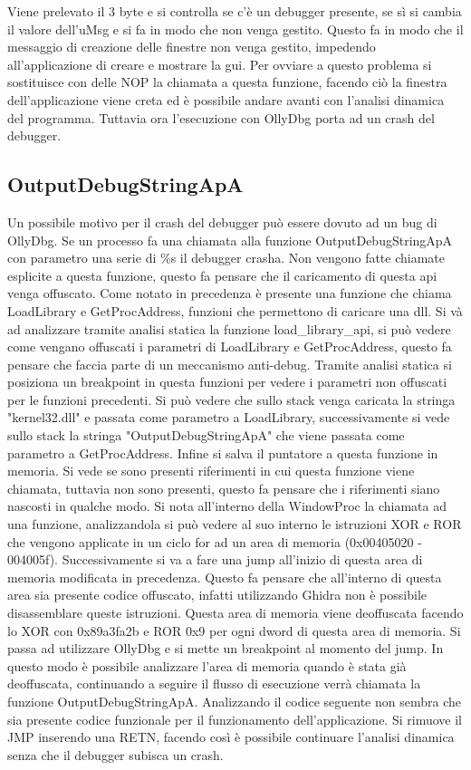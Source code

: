 \documentclass[a4paper,10pt]{article}
\begin{document}
 Viene prelevato il 3 byte e si controlla se c'è un debugger presente, se sì si cambia il valore dell'uMsg e si fa in modo che non venga gestito. Questo fa in modo che il messaggio di creazione delle finestre non venga gestito, impedendo all'applicazione di creare e mostrare la gui. Per ovviare a questo problema si sostituisce con delle NOP la chiamata a questa funzione, facendo ciò la finestra dell'applicazione viene creta ed è possibile andare avanti con l'analisi dinamica del programma. Tuttavia ora l'esecuzione con OllyDbg porta ad un crash del debugger.

\subsection{OutputDebugStringApA}
Un possibile motivo per il crash del debugger può essere dovuto ad un bug di OllyDbg. Se un processo fa una chiamata alla funzione OutputDebugStringApA con parametro una serie di \%s il debugger crasha. Non vengono fatte chiamate esplicite a questa funzione, questo fa pensare che il caricamento di questa api venga offuscato. Come notato in precedenza è presente una funzione che chiama LoadLibrary e GetProcAddress, funzioni che permettono di caricare una dll. Si và ad analizzare tramite analisi statica la funzione load\_library\_api, si può vedere come vengano offuscati i parametri di LoadLibrary e GetProcAddress, questo fa pensare che faccia parte di un meccanismo anti-debug. Tramite analisi statica si posiziona un breakpoint in questa funzioni per vedere i parametri non offuscati per le funzioni precedenti. Si può vedere che sullo stack venga caricata la stringa "kernel32.dll" e passata come parametro a LoadLibrary, successivamente si vede sullo stack la stringa "OutputDebugStringApA" che viene passata come parametro a GetProcAddress. Infine si salva il puntatore a questa funzione in memoria. Si vede se sono presenti riferimenti in cui questa funzione viene chiamata, tuttavia non sono presenti, questo fa pensare che i riferimenti siano nascosti in qualche modo.  Si nota all'interno della WindowProc la chiamata ad una funzione, analizzandola si può vedere al suo interno le istruzioni XOR e ROR che vengono applicate in un ciclo for ad un area di memoria (0x00405020 - 004005f).
 Successivamente si va a fare una jump all'inizio di questa area di memoria modificata in precedenza. Questo fa pensare che all'interno di questa area sia presente codice offuscato, infatti utilizzando Ghidra non è possibile disassemblare queste istruzioni.  Questa area di memoria viene deoffuscata facendo lo XOR con 0x89a3fa2b e ROR 0x9 per ogni dword di questa area di memoria.
 Si passa ad utilizzare OllyDbg e si mette un breakpoint al momento del jump. In questo modo è possibile analizzare l'area di memoria quando è stata già deoffuscata, continuando a seguire il flusso di esecuzione verrà chiamata la funzione OutputDebugStringApA. Analizzando il codice seguente non sembra che sia presente codice funzionale per il funzionamento dell'applicazione. Si rimuove il JMP inserendo una RETN, facendo così è possibile continuare l'analisi dinamica senza che il debugger subisca un crash.
\end{document}
